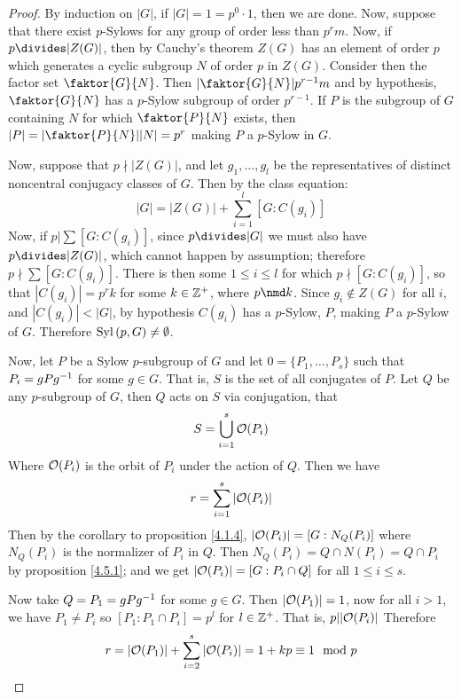 \begin{proof}
  By induction on $|G|$, if $|G|=1=p^0 \cdot 1$, then we are done.
  Now, suppose that there exist $p$-Sylows for any group of order less than
  $p^rm$. Now, if $p \divides |Z(G)|$, then by Cauchy's theorem $Z(G)$ has an element
  of order $p$ which generates a cyclic subgroup $N$ of order $p$ in $Z(G)$.
  Consider then the factor set $\faktor{G}{N}$. Then $|\faktor{G}{N}|p^{r-1}m$
  and by hypothesis, $\faktor{G}{N}$ has a $p$-Sylow subgroup of order
  $p^{r-1}$. If $P$ is the subgroup of $G$ containing $N$ for which
  $\faktor{P}{N}$ exists, then $|P|=|\faktor{P}{N}||N|=p^r$ making $P$
  a $p$-Sylow in $G$.

  Now, suppose that  $p \nmid |Z(G)|$, and let $g_1, \dots, g_l$ be the
  representatives of distinct noncentral conjugacy classes of $G$. Then by the
  class equation:
  \begin{equation*}
    |G|=|Z(G)|+\sum_{i=1}^l{[G : C(g_i)]}
  \end{equation*}
  Now, if $p|\sum{[G:C(g_i)]}$, since $p \divides |G|$ we must also have
  $p \divides |Z(G)|$, which cannot happen by assumption; therefore $p \nmid
  \sum{[G:C(g_i)]}$. There is then some $1 \leq i \leq l$ for which  $p \nmid
  [G:C(g_i)]$, so that $|C(g_i)|=p^rk$ for some $k \in \mathbb{Z}^+$, where  $p
  \nmd k$. Since  $g_i \notin Z(G)$ for all $i$, and $|C(g_i)|<|G|$,
  by hypothesis $C(g_i)$ has a $p$-Sylow, $P$, making  $P$ a $p$-Sylow of $G$.
  Therefore $\operatorname{Syl}{(p,G)} \neq \emptyset$.

  Now, let $P$ be a Sylow $p$-subgroup of $G$ and let  $0=\{P_1, \dots, P_s\}$
  such that $P_i=gPg^{-1}$ for some $g \in G$. That is,  $S$ is the set of
  all conjugates of  $P$. Let $Q$ be any $p$-subgroup of $G$, then $Q$ acts on
  $S$ via conjugation, that
  \begin{equation*}
    S=\bigcup_{i=1}^s{\mathcal{O}(P_i)}
  \end{equation*}
  Where $\mathcal{O}(P_i)$ is the orbit of $P_i$ under the action of  $Q$. Then we
  have
  \begin{equation*}
    r=\sum_{i=1}^s{|\mathcal{O}(P_i)|}
  \end{equation*}
  Then by the corollary to proposition \ref{4.1.4}, $|\mathcal{O}(P_i)|=[G:N_Q(P_i)]$ where
  $N_Q(P_i)$ is the normalizer of $P_i$ in $Q$. Then $N_Q(P_i)=Q \cap N(P_i)=Q
  \cap P_i$ by proposition \ref{4.5.1}; and we get $|\mathcal{O}(P_i)|=[G:P_i \cap Q]$ for
  all $1 \leq i \leq s$.

  Now take $Q=P_1=gPg^{-1}$ for some $g \in G$. Then  $|\mathcal{O}(P_1)|=1$, now
  for all $i>1$, we have $P_1 \neq P_i$ so $[P_1:P_1 \cap P_i]=p^l$ for $l
  \in \mathbb{Z}^+$. That is,  $p||\mathcal{O}(P_i)|$ Therefore
  \begin{equation*}
    r=|\mathcal{O}(P_1)|+\sum_{i=2}^s{|\mathcal{O}(P_i)|}=1+kp \equiv 1 \mod{p}
  \end{equation*}


\end{proof}
